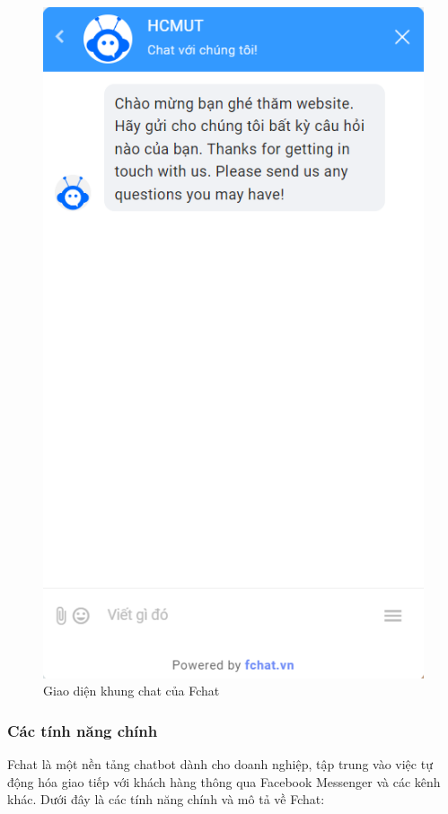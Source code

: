 \begin{figure}[H]
    \centering
    \includegraphics[width=0.5\linewidth]{Images/chatfchat.png}
    \vspace{0.5cm}
    \caption{Giao diện khung chat của Fchat}
    \label{fig:enter-label}
\end{figure}
\subsubsection{Các tính năng chính}
Fchat là một nền tảng chatbot dành cho doanh nghiệp, tập trung vào việc tự động hóa giao tiếp với khách hàng thông qua Facebook Messenger và các kênh khác. Dưới đây là các tính năng chính và mô tả về Fchat:

